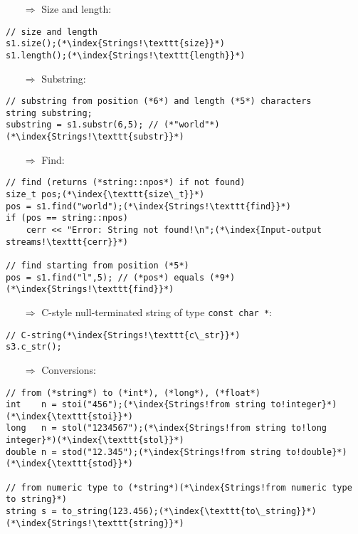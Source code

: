 \documentclass[10pt]{book}
\begin{document}
\begin{enumerate}
\item[$\Rightarrow$] Size and length:
\end{enumerate}
\begin{lstlisting}
// size and length
s1.size();(*\index{Strings!\texttt{size}}*)
s1.length();(*\index{Strings!\texttt{length}}*)
\end{lstlisting}
\begin{enumerate}
\item[$\Rightarrow$] Substring:
\end{enumerate}
\begin{lstlisting}
// substring from position (*6*) and length (*5*) characters
string substring;
substring = s1.substr(6,5); // (*"world"*)(*\index{Strings!\texttt{substr}}*)
\end{lstlisting}
\begin{enumerate}
\item[$\Rightarrow$] Find:
\end{enumerate}
\begin{lstlisting}
// find (returns (*string::npos*) if not found)
size_t pos;(*\index{\texttt{size\_t}}*)
pos = s1.find("world");(*\index{Strings!\texttt{find}}*)
if (pos == string::npos)
    cerr << "Error: String not found!\n";(*\index{Input-output streams!\texttt{cerr}}*)

// find starting from position (*5*)
pos = s1.find("l",5); // (*pos*) equals (*9*) (*\index{Strings!\texttt{find}}*)
\end{lstlisting}
\begin{enumerate}
\item[$\Rightarrow$] C-style null-terminated string of type \texttt{const char *}:
\end{enumerate}
\begin{lstlisting}
// C-string(*\index{Strings!\texttt{c\_str}}*)
s3.c_str();
\end{lstlisting}
\begin{enumerate}
\item[$\Rightarrow$] Conversions:
\end{enumerate}
\begin{lstlisting}
// from (*string*) to (*int*), (*long*), (*float*)
int    n = stoi("456");(*\index{Strings!from string to!integer}*)(*\index{\texttt{stoi}}*)
long   n = stol("1234567");(*\index{Strings!from string to!long integer}*)(*\index{\texttt{stol}}*)
double n = stod("12.345");(*\index{Strings!from string to!double}*)(*\index{\texttt{stod}}*)

// from numeric type to (*string*)(*\index{Strings!from numeric type to string}*)
string s = to_string(123.456);(*\index{\texttt{to\_string}}*)(*\index{Strings!\texttt{string}}*)
\end{lstlisting}
%
%
\end{document}
